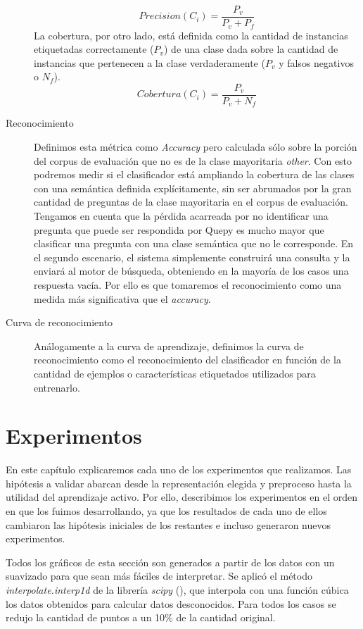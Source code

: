 \begin{description}
    $$Precision(C_i) = \frac{P_v}{P_v + P_f}$$
    La cobertura, por otro lado, está definida como la cantidad de instancias etiquetadas correctamente ($P_v$) de una clase dada sobre la cantidad de instancias que pertenecen a la clase verdaderamente ($P_v$ y falsos negativos o $N_f$).
    $$Cobertura(C_i) = \frac{P_v}{P_v + N_f}$$
    \item[Reconocimiento] Definimos esta métrica como \textit{Accuracy} pero calculada sólo sobre la porción del corpus de evaluación que no es de la clase mayoritaria \textit{other}. Con esto podremos medir si el clasificador está ampliando la cobertura de las clases con una semántica definida explícitamente, sin ser abrumados por la gran cantidad de preguntas de la clase mayoritaria en el corpus de evaluación. Tengamos en cuenta que la pérdida acarreada por no identificar una pregunta que puede ser respondida por Quepy es mucho mayor que clasificar una pregunta con una clase semántica que no le corresponde. En el segundo escenario, el sistema simplemente construirá una consulta y la enviará al motor de búsqueda, obteniendo en la mayoría de los casos una respuesta vacía. Por ello es que tomaremos el reconocimiento como una medida más significativa que el \textit{accuracy}.
    \item[Curva de reconocimiento] Análogamente a la curva de aprendizaje, definimos la curva de reconocimiento como el reconocimiento del clasificador en función de la cantidad de ejemplos o características etiquetados utilizados para entrenarlo.
\end{description}

\chapter{Experimentos}

En este capítulo explicaremos cada uno de los experimentos que realizamos. Las hipótesis a validar abarcan desde la representación elegida y preproceso hasta la utilidad del aprendizaje activo. Por ello, describimos los experimentos en el orden en que los fuimos desarrollando, ya que los resultados de cada uno de ellos cambiaron las hipótesis iniciales de los restantes e incluso generaron nuevos experimentos.

Todos los gráficos de esta sección son generados a partir de los datos con un suavizado para que sean más fáciles de interpretar. Se aplicó el método \textit{interpolate.interp1d} de la librería \textit{scipy} (\citet{scipy}), que interpola con una función cúbica los datos obtenidos para calcular datos desconocidos. Para todos los casos se redujo la cantidad de puntos a un 10\% de la cantidad original.

